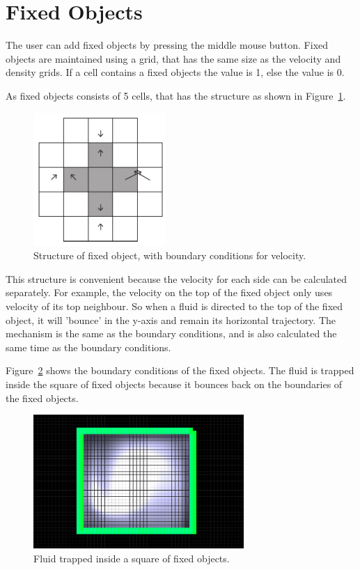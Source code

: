 \section{Fixed Objects}
The user can add fixed objects by pressing the middle mouse button.
Fixed objects are maintained using a grid, that has the same size as the velocity and density grids.
If a cell contains a fixed objects the value is 1, else the value is 0.

\noindent As fixed objects consists of 5 cells, that has the structure as shown in Figure~\ref{fig:fixedstructure}.

\begin{figure}[h]
    \centering
    \includegraphics[width=5cm]{img/fixedstructure.pdf}
    \caption{Structure of fixed object, with boundary conditions for velocity.}
    \label{fig:fixedstructure}
\end{figure}

\noindent This structure is convenient because the velocity for each side can be calculated separately.
For example, the velocity on the top of the fixed object only uses velocity of its top neighbour.
So when a fluid is directed to the top of the fixed object, it will 'bounce' in the y-axis and remain its horizontal trajectory.
The mechanism is the same as the boundary conditions, and is also calculated the same time as the boundary conditions.

\noindent Figure~\ref{fig:fixed} shows the boundary conditions of the fixed objects. The fluid is trapped inside the square of fixed objects because it bounces back on the boundaries of the fixed objects.

\begin{figure}
    \centering
    \includegraphics[width=8cm]{img/fixed.png}
    \caption{Fluid trapped inside a square of fixed objects.}
    \label{fig:fixed}
\end{figure}
